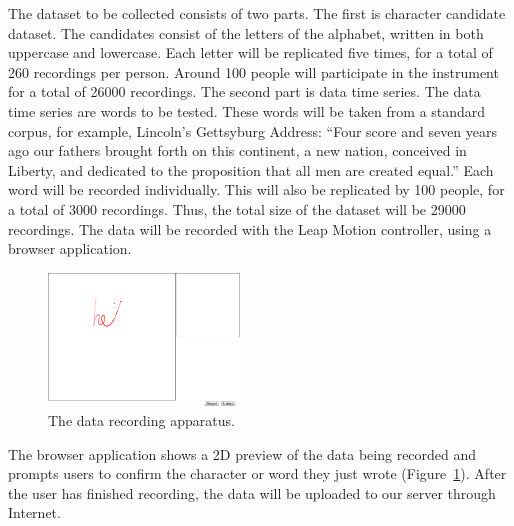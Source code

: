 The dataset to be collected consists of two parts.
The first is character candidate dataset. The candidates consist of the letters of the alphabet, written in both uppercase and lowercase. Each letter will be replicated five times, for a total of 260 recordings per person. Around 100 people will participate in the instrument for a total of 26000 recordings.
The second part is data time series. The data time series are words to be tested. These words will be taken from a standard corpus, for example, Lincoln's Gettsyburg Address: ``Four score and seven years ago our fathers brought forth on this continent, a new nation, conceived in Liberty, and dedicated to the proposition that all men are created equal.'' Each word will be recorded individually. 
This will also be replicated by 100 people, for a total of 3000 recordings.
Thus, the total size of the dataset will be 29000 recordings.
The data will be recorded with the Leap Motion controller, using a browser application. 

\begin{figure}
  \centering
  \includegraphics[width=2in]{images/recording-1-cropped.PNG}
  \caption{The data recording apparatus.}
  \label{fig:recording-ui}
\end{figure}

The browser application shows a 2D preview of the data being recorded and prompts users to confirm the character or word they just wrote (Figure~\ref{fig:recording-ui}).
After the user has finished recording, the data will be uploaded to our server through Internet.
